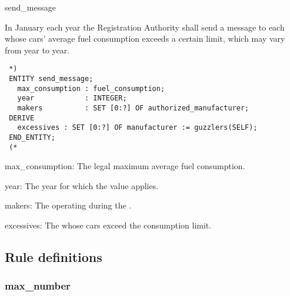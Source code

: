 \documentclass{article}
\begin{document}
 \begin{Mnamedesc}{send_message}

 \begin{Mdesctext}

 In January each year the Registration Authority shall send a message to each
  whose cars' average fuel consumption exceeds a certain
 limit, which may vary from year to year.

 \end{Mdesctext}

 \begin{Mexp}
 \begin{verbatim}
 *)
 ENTITY send_message;
   max_consumption : fuel_consumption;
   year            : INTEGER;
   makers          : SET [0:?] OF authorized_manufacturer;
 DERIVE
   excessives : SET [0:?] OF manufacturer := guzzlers(SELF);
 END_ENTITY;
 (*
 \end{verbatim}
 \end{Mexp}

 \begin{Matts}

 \item[max\_consumption:] The legal maximum average fuel consumption.

 \item[year:] The year for which the  value applies.

 \item[makers:] The  operating during the
 .

 \item[excessives:] The  whose cars exceed the consumption
 limit.

 \end{Matts}

 \end{Mnamedesc}

 \subsection{Rule definitions}

 \subsubsection{max\_number}
\end{document}
